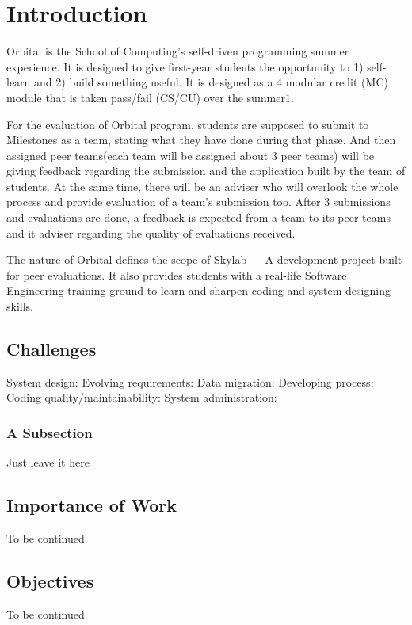 \chapter{Introduction}

Orbital is the School of Computing’s self-driven programming summer experience. It is designed to give first-year students the opportunity to 1) self-learn and 2) build something useful. It is designed as a 4 modular credit (MC) module that is taken pass/fail (CS/CU) over the summer1.

For the evaluation of Orbital program, students are supposed to submit to Milestones as a team, stating what they have done during that phase. And then assigned peer teams(each team will be assigned about 3 peer teams) will be giving feedback regarding the submission and the application built by the team of students. At the same time, there will be an adviser who will overlook the whole process and provide evaluation of a team's submission too. After 3 submissions and evaluations are done, a feedback is expected from a team to its peer teams and it adviser regarding the quality of evaluations received.

The nature of Orbital defines the scope of Skylab — A development project built for peer evaluations. It also provides students with a real-life Software Engineering training ground to learn and sharpen coding and system designing skills. 

\section{Challenges}

System design:
Evolving requirements:
Data migration:
Developing process:
Coding quality/maintainability:
System administration: 

\subsection{A Subsection}

Just leave it here

\section{Importance of Work}

To be continued

\section{Objectives}

To be continued